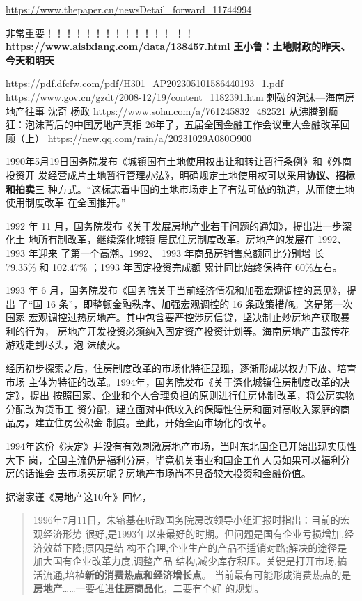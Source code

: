 \url{https://www.thepaper.cn/newsDetail_forward_11744994}


非常重要！！！！！！！！！！！！！
！！\textbf{https://www.aisixiang.com/data/138457.html}
\textbf{王小鲁：土地财政的昨天、今天和明天}

https://pdf.dfcfw.com/pdf/H301_AP202305101586440193_1.pdf
https://www.gov.cn/gzdt/2008-12/19/content_1182391.htm
刺破的泡沫—海南房地产往事  沈奇 杨政 https://www.sohu.com/a/761245832_482521
从沸腾到癫狂：泡沫背后的中国房地产真相
26年了，五届全国金融工作会议重大金融改革回顾（上）
https://new.qq.com/rain/a/20231029A080O900


1990年5月19日国务院发布《城镇国有土地使用权出让和转让暂行条例》和《外商投资开
发经营成片土地暂行管理办法》，明确规定土地使用权可以采用\textbf{协议、招标和拍卖}三
种方式。“这标志着中国的土地市场走上了有法可依的轨道，从而使土地使用制度改革
在全国推开。”


1992 年 11 月，国务院发布《关于发展房地产业若干问题的通知》，提出进一步深化土
地所有制改革，继续深化城镇 居民住房制度改革。房地产的发展在 1992、1993 年迎来
了第一个高潮。1992、 1993 年商品房销售总额同比分别增
长 79.35\% 和 102.47\% ；1993 年固定投资完成额 累计同比始终保持在 60\%左右。

1993 年 6 月，国务院发布《国务院关于当前经济情况和加强宏观调控的意见》，提出
了“国 16 条”，即整顿金融秩序、加强宏观调控的 16 条政策措施。这是第一次国家
宏观调控过热房地产。其中包含要严控涉房信贷，坚决制止炒房地产获取暴利的行为，
房地产开发投资必须纳入固定资产投资计划等。海南房地产击鼓传花游戏走到尽头，泡
沫破灭。

经历初步探索之后，住房制度改革的市场化特征显现，逐渐形成以权力下放、培育市场
主体为特征的改革。1994年，国务院发布《关于深化城镇住房制度改革的决定》，提出
按照国家、企业和个人合理负担的原则进行住房体制改革，将公房实物分配改为货币工
资分配，建立面对中低收入的保障性住房和面对高收入家庭的商品房，建立住房公积金
制度。至此，开始全面市场化的改革。\cite{CJZK201802012}

1994年这份《决定》并没有有效刺激房地产市场，当时东北国企已开始出现实质性大下
岗，全国主流仍是福利分房，毕竟机关事业和国企工作人员如果可以福利分房的话谁会
去市场买房呢？房地产市场尚不具备较大投资和金融价值。

据谢家谨《房地产这10年》回忆，
\begin{quotation}
  1996年7月11日，朱镕基在听取国务院房改领导小组汇报时指出：目前的宏观经济形势
  很好,是1993年以来最好的时期。但问题是国有企业亏损增加,经济效益下降;原因是结
  构不合理,企业生产的产品不适销对路;解决的途径是加大国有企业改革力度,调整产品
  结构,减少库存积压。关键是打开市场,搞活流通,培植\textbf{新的消费热点和经济增长点}。
  当前最有可能形成消费热点的是\textbf{房地产}……一要推进\textbf{住房商品化}，二要有个好
  的规划。
\end{quotation}

